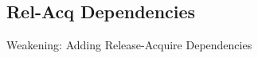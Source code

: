 \documentclass[notes xcolor=dvipsnames]{beamer}
\begin{document}
    \subsection{Rel-Acq Dependencies}
    \begin{frame}{Weakening: Adding Release-Acquire Dependencies}
        
        \begin{figure}
        \end{figure}

        
        \begin{columns}
            
            \begin{column}{0.5\textwidth}

                \begin{figure}
                \end{figure}
                
            \end{column}

            \begin{column}{0.5\textwidth}
                
                \begin{figure}
                \end{figure}

            \end{column}

        \end{columns}
    
    \end{frame}
\end{document}
